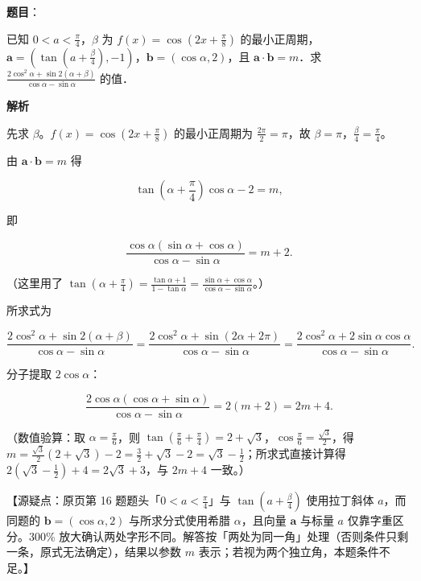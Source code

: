 \begin{answer}

\textbf{题目}：

已知 $0<a<\frac{\pi}{4}$，$\beta$ 为 $f(x)=\cos\left(2x+\frac{\pi}{8}\right)$ 的最小正周期，$\boldsymbol a=\left(\tan\left(a+\frac{\beta}{4}\right),-1\right)$，$\boldsymbol b=(\cos\alpha,2)$，且 $\boldsymbol a\cdot\boldsymbol b=m$．求 $\frac{2\cos^2\alpha+\sin2(\alpha+\beta)}{\cos\alpha-\sin\alpha}$ 的值．

\textbf{解析}

先求 $\beta$。$f(x)=\cos\left(2x+\frac{\pi}{8}\right)$ 的最小正周期为 $\frac{2\pi}{2}=\pi$，故 $\beta=\pi$，$\frac{\beta}{4}=\frac{\pi}{4}$。

由 $\boldsymbol a\cdot\boldsymbol b=m$ 得

\nopagebreak[4]
\[\tan\left(\alpha+\frac{\pi}{4}\right)\cos\alpha-2=m,\]

即

\nopagebreak[4]
\[\frac{\cos\alpha(\sin\alpha+\cos\alpha)}{\cos\alpha-\sin\alpha}=m+2.\]

（这里用了 $\tan\left(\alpha+\frac{\pi}{4}\right)=\frac{\tan\alpha+1}{1-\tan\alpha}=\frac{\sin\alpha+\cos\alpha}{\cos\alpha-\sin\alpha}$。）

所求式为

\nopagebreak[4]
\[\frac{2\cos^2\alpha+\sin2(\alpha+\beta)}{\cos\alpha-\sin\alpha}=\frac{2\cos^2\alpha+\sin(2\alpha+2\pi)}{\cos\alpha-\sin\alpha}=\frac{2\cos^2\alpha+2\sin\alpha\cos\alpha}{\cos\alpha-\sin\alpha}.\]

分子提取 $2\cos\alpha$：

\nopagebreak[4]
\[\frac{2\cos\alpha(\cos\alpha+\sin\alpha)}{\cos\alpha-\sin\alpha}=2(m+2)=2m+4.\]

（数值验算：取 $\alpha=\frac{\pi}{6}$，则 $\tan\left(\frac{\pi}{6}+\frac{\pi}{4}\right)=2+\sqrt3$，$\cos\frac{\pi}{6}=\frac{\sqrt3}{2}$，得 $m=\frac{\sqrt3}{2}(2+\sqrt3)-2=\frac{3}{2}+\sqrt3-2=\sqrt3-\frac12$；所求式直接计算得 $2\left(\sqrt3-\frac12\right)+4=2\sqrt3+3$，与 $2m+4$ 一致。）

【源疑点：原页第 16 题题头「$0<a<\frac{\pi}{4}$」与 $\tan\left(a+\frac{\beta}{4}\right)$ 使用拉丁斜体 $a$，而同题的 $\boldsymbol b=(\cos\alpha,2)$ 与所求分式使用希腊 $\alpha$，且向量 $\boldsymbol a$ 与标量 $a$ 仅靠字重区分。300\% 放大确认两处字形不同。解答按「两处为同一角」处理（否则条件只剩一条，原式无法确定），结果以参数 $m$ 表示；若视为两个独立角，本题条件不足。】


\end{answer}
